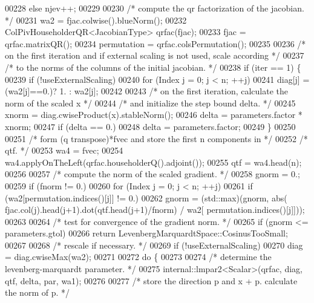 \begin{DoxyCode}
00228     \textcolor{keywordflow}{else} njev++;
00229 
00230     \textcolor{comment}{/* compute the qr factorization of the jacobian. */}
00231     wa2 = fjac.colwise().blueNorm();
00232     ColPivHouseholderQR<JacobianType> qrfac(fjac);
00233     fjac = qrfac.matrixQR();
00234     permutation = qrfac.colsPermutation();
00235 
00236     \textcolor{comment}{/* on the first iteration and if external scaling is not used, scale according */}
00237     \textcolor{comment}{/* to the norms of the columns of the initial jacobian. */}
00238     \textcolor{keywordflow}{if} (iter == 1) \{
00239         \textcolor{keywordflow}{if} (!useExternalScaling)
00240             \textcolor{keywordflow}{for} (Index j = 0; j < n; ++j)
00241                 diag[j] = (wa2[j]==0.)? 1. : wa2[j];
00242 
00243         \textcolor{comment}{/* on the first iteration, calculate the norm of the scaled x */}
00244         \textcolor{comment}{/* and initialize the step bound delta. */}
00245         xnorm = diag.cwiseProduct(x).stableNorm();
00246         delta = parameters.factor * xnorm;
00247         \textcolor{keywordflow}{if} (delta == 0.)
00248             delta = parameters.factor;
00249     \}
00250 
00251     \textcolor{comment}{/* form (q transpose)*fvec and store the first n components in */}
00252     \textcolor{comment}{/* qtf. */}
00253     wa4 = fvec;
00254     wa4.applyOnTheLeft(qrfac.householderQ().adjoint());
00255     qtf = wa4.head(n);
00256 
00257     \textcolor{comment}{/* compute the norm of the scaled gradient. */}
00258     gnorm = 0.;
00259     \textcolor{keywordflow}{if} (fnorm != 0.)
00260         \textcolor{keywordflow}{for} (Index j = 0; j < n; ++j)
00261             \textcolor{keywordflow}{if} (wa2[permutation.indices()[j]] != 0.)
00262                 gnorm = (std::max)(gnorm, abs( fjac.col(j).head(j+1).dot(qtf.head(j+1)/fnorm) / wa2[
      permutation.indices()[j]]));
00263 
00264     \textcolor{comment}{/* test for convergence of the gradient norm. */}
00265     \textcolor{keywordflow}{if} (gnorm <= parameters.gtol)
00266         \textcolor{keywordflow}{return} LevenbergMarquardtSpace::CosinusTooSmall;
00267 
00268     \textcolor{comment}{/* rescale if necessary. */}
00269     \textcolor{keywordflow}{if} (!useExternalScaling)
00270         diag = diag.cwiseMax(wa2);
00271 
00272     \textcolor{keywordflow}{do} \{
00273 
00274         \textcolor{comment}{/* determine the levenberg-marquardt parameter. */}
00275         internal::lmpar2<Scalar>(qrfac, diag, qtf, delta, par, wa1);
00276 
00277         \textcolor{comment}{/* store the direction p and x + p. calculate the norm of p. */}

\end{DoxyCode}
